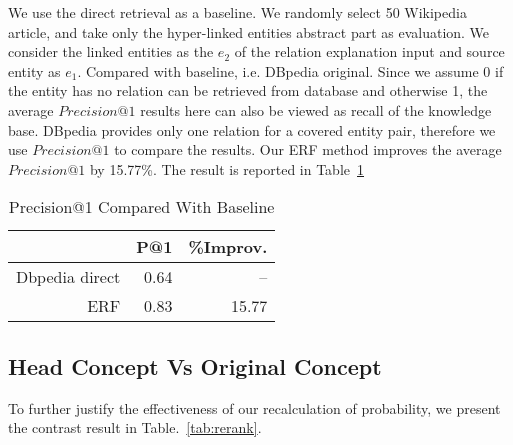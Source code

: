 We use the direct retrieval as a baseline.
We randomly select 50 Wikipedia article, and take only the hyper-linked entities abstract part as evaluation.
We consider the linked entities as the $e_2$ of the relation explanation input and source entity as $e_1$.
Compared with baseline, i.e. DBpedia original.
Since we assume 0 if the entity has no relation can be retrieved from database and otherwise 1, the average $Precision@1$ results here can also be viewed as \ac{recall} of the knowledge base.
DBpedia provides only one relation for a covered entity pair, therefore we use $Precision@1$ to compare the results.
Our ERF method improves the average $Precision@1$ by 15.77\%.
The result is reported in Table~\ref{tab:precision_compare}

\begin{table}[htbp]
  \centering
  \caption{Precision@1 Compared With Baseline}
    \begin{tabular}{rrr}
    \toprule
         & P@1  & \%Improv. \\
    \midrule
    Dbpedia direct & 0.64 & -- \\
    ERF  & 0.83 & 15.77 \\
    \bottomrule
    \end{tabular}%
  \label{tab:precision_compare}%
\end{table}%






\subsection{Head Concept Vs Original Concept}

To further justify the effectiveness of our recalculation of probability, we present the contrast result in Table.~\ref{tab:rerank}.



